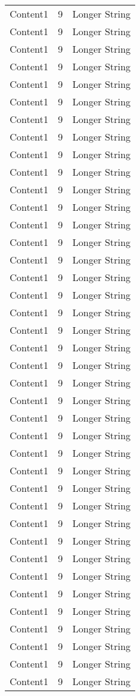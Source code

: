 \documentclass{article}%
\begin{document}
\begin{longtable}{l l l}
Content1&9&Longer String\\%
Content1&9&Longer String\\%
Content1&9&Longer String\\%
Content1&9&Longer String\\%
Content1&9&Longer String\\%
Content1&9&Longer String\\%
Content1&9&Longer String\\%
Content1&9&Longer String\\%
Content1&9&Longer String\\%
Content1&9&Longer String\\%
Content1&9&Longer String\\%
Content1&9&Longer String\\%
Content1&9&Longer String\\%
Content1&9&Longer String\\%
Content1&9&Longer String\\%
Content1&9&Longer String\\%
Content1&9&Longer String\\%
Content1&9&Longer String\\%
Content1&9&Longer String\\%
Content1&9&Longer String\\%
Content1&9&Longer String\\%
Content1&9&Longer String\\%
Content1&9&Longer String\\%
Content1&9&Longer String\\%
Content1&9&Longer String\\%
Content1&9&Longer String\\%
Content1&9&Longer String\\%
Content1&9&Longer String\\%
Content1&9&Longer String\\%
Content1&9&Longer String\\%
Content1&9&Longer String\\%
Content1&9&Longer String\\%
Content1&9&Longer String\\%
Content1&9&Longer String\\%
Content1&9&Longer String\\%
Content1&9&Longer String\\%
Content1&9&Longer String\\%
Content1&9&Longer String\\%
Content1&9&Longer String\\%

\end{longtable}
\end{document}
